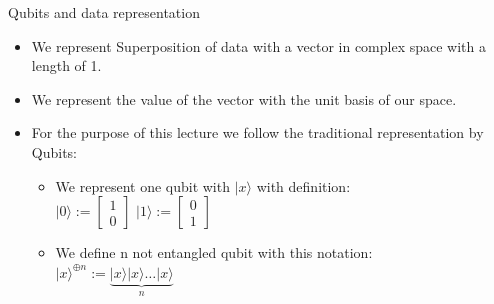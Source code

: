     \begin{frame}{Qubits and data representation}
        \begin{itemize}
            \item We represent Superposition of data with a vector in complex space with a length of 1.
            \item We represent the value of the vector with the unit basis of our space.
            \item For the purpose of this lecture we follow the traditional representation by Qubits:
                \begin{itemize}
                    \item We represent one qubit with $|x\rangle $ with definition:\\
                    $|0\rangle := \begin{bmatrix}
                        1\\
                        0
                    \end{bmatrix}$
                    $|1\rangle := \begin{bmatrix}
                        0\\
                        1
                    \end{bmatrix}$
                    \item We define n not \alert{entangled} qubit with this notation:\\
                    $|x\rangle^{\oplus n} := \underbrace{|x\rangle|x\rangle \dots |x\rangle}_n $
                \end{itemize}
        \end{itemize}
    \end{frame}

